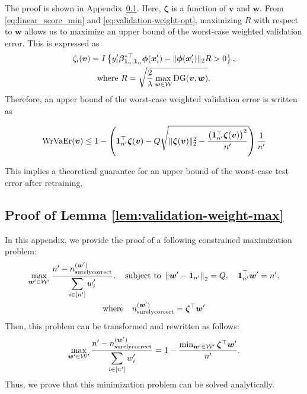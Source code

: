 	The proof is shown in Appendix~\ref{app:validation-weight-max}.
	Here, $\bm \zeta$ is a function of $\bm v$ and $\bm w$.
	From \eqref{eq:linear_score_min} and \eqref{eq:validation-weight-opt}, maximizing $R$ with respect to $\bm w$ allows us to maximize an upper bound of the worst-case weighted validation error. This is expressed as
	\begin{gather}
		\zeta_i(\bm v)
		=
		I\left\{
		y_i^\prime \bm \beta_{\bm 1_n, \bm 1_n}^{*\top} \bm \phi(\bm x_i^\prime) - \|\bm \phi(\bm x_i^\prime)\|_2 R > 0
		\right\}, \\
		\text{where } R = \sqrt{\frac{2}{\lambda} \max_{\bm w \in {\mathcal W}} {\rm DG}(\bm v, \bm w)}.
	 \end{gather}
	Therefore, an upper bound of the worst-case weighted validation error is written as

	\begin{align}
		{\rm WrVaEr}(\bm v)
		\le
		1
		-
		\left(
		\bm 1_{n^\prime}^\top \bm \zeta(\bm v)
		-
		Q
		\sqrt{
		\|\bm \zeta(\bm v)\|_2^2
		-
		\frac{
		\left(\bm 1_{n^\prime}^\top \bm \zeta(\bm v)\right)^2
		}{
		n^\prime
		}
		}
		\right)
		\frac{1}{n^\prime}
		\end{align}

	This implies a theoretical guarantee for an upper bound of the worst-case test error after retraining.



\subsection{Proof of Lemma \ref{lem:validation-weight-max}} \label{app:validation-weight-max}

In this appendix, we provide the proof of a following constrained maximization problem:
\begin{gather}
	\displaystyle \max_{\bm w' \in \cal W'} \frac{n^\prime - {n_{\rm surelycorrect}^{(\bm w')}}}{\displaystyle \sum_{i \in\left[n^ \prime \right]} w_i'}, \quad \text{subject to } \left\|\bm w'- \bm 1_{n ^\prime} \right\|_2 = Q, \quad \bm 1_{n ^\prime}^\top \bm w' = n ^\prime, \\
	\text{where} \quad n_{\rm surelycorrect}^{(\bm w')} = \bm \zeta^\top \bm w'
\end{gather}
Then, this problem can be transformed and rewritten as follows:
\begin{align}
	\label{eq:linear-score-sum}
	\displaystyle \max_{\bm w' \in \cal W'} \frac{n^\prime - {n_{\rm surelycorrect}^{(\bm w')}}}{\displaystyle \sum_{i \in\left[n^ \prime \right]} w_i'}
	= 1 - \frac{\min_{\bm w' \in {\cal W'}} \bm \zeta^\top \bm w'}{n ^\prime}.
\end{align}
Thus, we prove that this minimization problem can be solved analytically.

